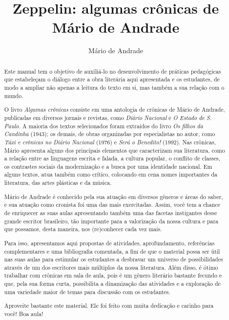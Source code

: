 \documentclass[12pt]{extarticle}
\begin{document}
\newcommand{\AutorLivro}{Mário de Andrade}
\newcommand{\TituloLivro}{Zeppelin: algumas crônicas de Mário de Andrade}
\newcommand{\Tema}{Ficção, mistério e fantasia}
\newcommand{\Genero}{Conto, crônica e novela}
\newcommand{\issnppub}{---}
\newcommand{\issnepub}{---}
\newcommand{\colaborador}{\textbf{Rodrigo Ribeiro Neves} é uma pessoa incrível e vai fazer um bom serviço.}


\title{\TituloLivro}
\author{\AutorLivro}
\def\authornotes{\colaborador}

\date{}
\maketitle

\begin{abstract}
Este manual tem o objetivo de auxiliá-lo no desenvolvimento de práticas
pedagógicas que estabeleçam o diálogo entre a obra literária aqui
apresentada e os estudantes, de modo a ampliar não apenas a leitura do
texto em si, mas também a sua relação com o mundo.

O livro \emph{Algumas crônicas} consiste em uma antologia de crônicas de
Mário de Andrade, publicadas em diversos jornais e revistas, como
\emph{Diário Nacional} e \emph{O Estado de S. Paulo}. A maioria dos
textos selecionados foram extraídos do livro \emph{Os filhos da
Candinha} (1943); os demais, de obras organizadas por especialistas no
autor, como \emph{Táxi e crônicas no Diário Nacional} (1976) e
\emph{Será o Benedito!} (1992). Nas crônicas, Mário apresenta alguns dos
principais elementos que caracterizam sua literatura, como a relação
entre as linguagens escrita e falada, a cultura popular, o conflito de
classes, os contrastes sociais da modernização e a busca por uma
identidade nacional. Em alguns textos, atua também como crítico,
colocando em cena nomes importantes da literatura, das artes plásticas e
da música.

Mário de Andrade é conhecido pela sua atuação em diversos gêneros e
áreas do saber, e sua atuação como cronista foi uma das mais
exercitadas. Assim, você tem a chance de enriquecer as suas aulas
apresentando também uma das facetas instigantes desse grande escritor
brasileiro, tão importante para a valorização da nossa cultura e para
que possamos, desta maneira, nos (re)conhecer cada vez mais.

Para isso, apresentamos aqui propostas de atividades, aprofundamento,
referências complementares e uma bibliografia comentada, a fim de que o
material possa ser útil nas suas aulas para estimular os estudantes a
desbravar um universo de possibilidades através de um dos escritores
mais múltiplos da nossa literatura. Além disso, é ótimo trabalhar com
crônicas em sala de aula, pois é um gênero literário bastante fecundo e
que, pela sua forma curta, possibilita a dinamização das atividades e a
exploração de uma variedade maior de temas para discussão com os
estudantes.

Aproveite bastante este material. Ele foi feito com muita dedicação e
carinho para você! Boa aula!
\end{abstract}
\end{document}

